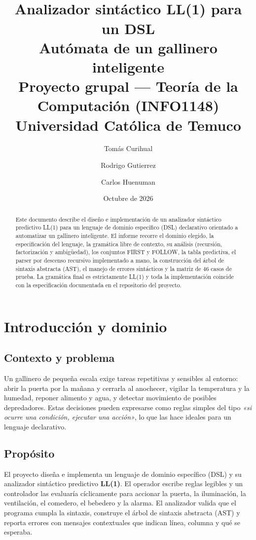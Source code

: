 \documentclass[12pt,a4paper]{article}
\title{ \\
  \vspace{1.5cm}
  {\Huge \textbf{Analizador sintáctico LL(1) para un DSL}} \\
  \vspace{0.4cm}
  {\LARGE Autómata de un gallinero inteligente} \\
  \vspace{2cm}
  {\large Proyecto grupal --- Teoría de la Computación (INFO1148)} \\
  {\large Universidad Católica de Temuco} \\
  \vspace{1.5cm}
}
\author{
  Tomás Curihual \and
  Rodrigo Gutierrez \and
  Carlos Huenuman
}
\date{Octubre de 2026}
\begin{document}
\maketitle

\begin{abstract}
\noindent
Este documento describe el diseño e implementación de un analizador
sintáctico predictivo LL(1) para un lenguaje de dominio específico (DSL)
declarativo orientado a automatizar un gallinero inteligente. El informe
recorre el dominio elegido, la especificación del lenguaje, la gramática
libre de contexto, su análisis (recursión, factorización y ambigüedad), los
conjuntos FIRST y FOLLOW, la tabla predictiva, el parser por descenso
recursivo implementado a mano, la construcción del árbol de sintaxis
abstracta (AST), el manejo de errores sintácticos y la matriz de 46 casos
de prueba. La gramática final es estrictamente LL(1) y toda la
implementación coincide con la especificación documentada en el
repositorio del proyecto.
\end{abstract}

\tableofcontents
\newpage

\section{Introducción y dominio}

\subsection{Contexto y problema}
Un gallinero de pequeña escala exige tareas repetitivas y sensibles al
entorno: abrir la puerta por la mañana y cerrarla al anochecer, vigilar la
temperatura y la humedad, reponer alimento y agua, y detectar movimiento de
posibles depredadores. Estas decisiones pueden expresarse como reglas simples
del tipo \emph{«si ocurre una condición, ejecutar una acción»}, lo que las
hace ideales para un lenguaje declarativo.

\subsection{Propósito}
El proyecto diseña e implementa un lenguaje de dominio específico (DSL) y su
analizador sintáctico predictivo \textbf{LL(1)}. El operador escribe reglas
legibles y un controlador las evaluaría cíclicamente para accionar la puerta,
la iluminación, la ventilación, el comedero, el bebedero y la alarma. El
analizador valida que el programa cumpla la sintaxis, construye el árbol de
sintaxis abstracta (AST) y reporta errores con mensajes contextuales que
indican línea, columna y qué se esperaba.
\end{document}
